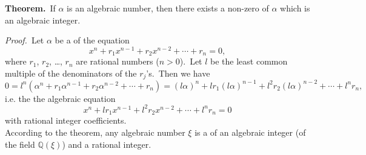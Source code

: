 \documentclass[12pt]{article}
\theoremstyle{definition}
\begin{document}
\textbf{Theorem.}\, If $\alpha$ is an algebraic number, then there exists a non-zero  of $\alpha$ which is an algebraic integer.


{\em Proof.}\, Let $\alpha$ be a  of the equation
$$x^n\!+\!r_1x^{n-1}\!+\!r_2x^{n-2}\!+\cdots+\!r_n = 0,$$
where $r_1$, $r_2$, \ldots, $r_n$ are rational numbers ($n > 0$).\, Let $l$ be the least common multiple of the denominators of the $r_j$'s.\, Then we have
$$0 = l^n(\alpha^n\!+\!r_1\alpha^{n-1}\!+\!r_2\alpha^{n-2}\!+\cdots+\!r_n) =
 (l\alpha)^n\!+\!lr_1(l\alpha)^{n-1}\!+\!l^2r_2(l\alpha)^{n-2}\!+\cdots+\!l^nr_n,$$
i.e. the  the algebraic equation
$$x^n\!+\!lr_1x^{n-1}\!+\!l^2r_2x^{n-2}\!+\cdots+\!l^nr_n = 0$$
with rational integer coefficients.\\

According to the theorem, any algebraic number $\xi$ is a 
 of an algebraic integer 
(of the field $\mathbb{Q}(\xi)$) and a rational integer.
\end{document}
